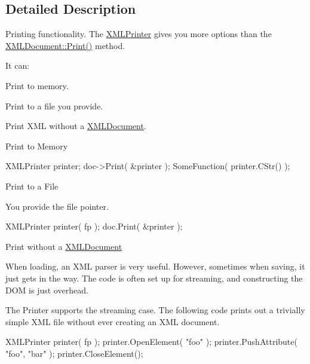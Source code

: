 \subsection{Detailed Description}
Printing functionality. The \hyperlink{classtinyxml2_1_1_x_m_l_printer}{X\-M\-L\-Printer} gives you more options than the \hyperlink{classtinyxml2_1_1_x_m_l_document_aa2caf31f58ddffa9d587c48c455720aa}{X\-M\-L\-Document\-::\-Print()} method.

It can\-:
\begin{DoxyEnumerate}
\item Print to memory.
\item Print to a file you provide.
\item Print X\-M\-L without a \hyperlink{classtinyxml2_1_1_x_m_l_document}{X\-M\-L\-Document}.
\end{DoxyEnumerate}

Print to Memory

\begin{DoxyVerb}XMLPrinter printer;
doc->Print( &printer );
SomeFunction( printer.CStr() );
\end{DoxyVerb}


Print to a File

You provide the file pointer. \begin{DoxyVerb}XMLPrinter printer( fp );
doc.Print( &printer );
\end{DoxyVerb}


Print without a \hyperlink{classtinyxml2_1_1_x_m_l_document}{X\-M\-L\-Document}

When loading, an X\-M\-L parser is very useful. However, sometimes when saving, it just gets in the way. The code is often set up for streaming, and constructing the D\-O\-M is just overhead.

The Printer supports the streaming case. The following code prints out a trivially simple X\-M\-L file without ever creating an X\-M\-L document.

\begin{DoxyVerb}XMLPrinter printer( fp );
printer.OpenElement( "foo" );
printer.PushAttribute( "foo", "bar" );
printer.CloseElement();
\end{DoxyVerb}
 


